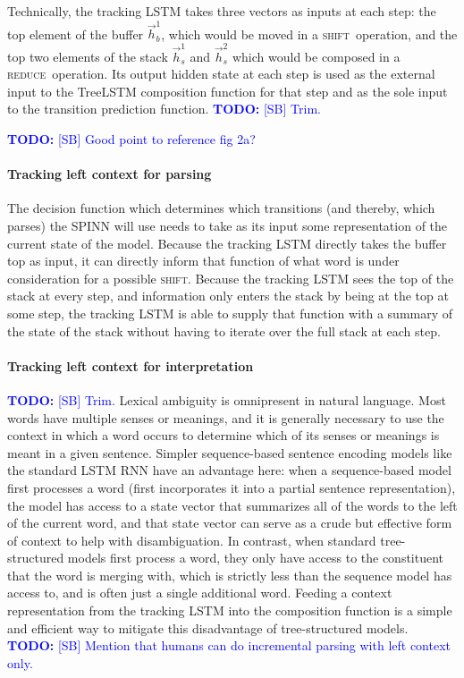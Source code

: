 \documentclass[11pt]{article}
\newcommand\todo[1]{\textcolor{blue}{\textbf{TODO:} #1}}
\newcommand{\shift}{\textsc{shift}}
\newcommand{\reduce}{\textsc{reduce}}
\begin{document}
Technically, the tracking LSTM takes three vectors as inputs at each step: the top element of the buffer $\vec{h}_b^1$, which would be moved in a \shift~operation, and the top two elements of the stack $\vec{h}_s^1$ and $\vec{h}_s^2$ which would be composed in a \reduce~operation. Its output hidden state at each step is used as the external input to the TreeLSTM composition function for that step and as the sole input to the transition prediction function. \todo{[SB] Trim.}

\todo{[SB] Good point to reference fig 2a?}

\paragraph{Tracking left context for parsing} The decision function which determines which transitions (and thereby, which parses) the SPINN will use needs to take as its input some representation of the current state of the model. Because the tracking LSTM directly takes the buffer top as input, it can directly inform that function of what word is under consideration for a possible \shift. Because the tracking LSTM sees the top of the stack at every step, and information only enters the stack by being at the top at some step, the tracking LSTM is able to supply that function with a summary of the state of the stack without having to iterate over the full stack at each step.

\paragraph{Tracking left context for interpretation} \todo{[SB] Trim.} Lexical ambiguity is omnipresent in natural language. Most words have multiple senses or meanings, and it is generally necessary to use the context in which a word occurs to determine which of its senses or meanings is meant in a given sentence. Simpler sequence-based sentence encoding models like the standard LSTM RNN have an advantage here: when a sequence-based model first processes a word (first incorporates it into a partial sentence representation), the model has access to a state vector that summarizes all of the words to the left of the current word, and that state vector can serve as a crude but effective form of context to help with disambiguation. In contrast, when standard tree-structured models first process a word, they only have access to the constituent that the word is merging with, which is strictly less than the sequence model has access to, and is often just a single additional word. Feeding a context representation from the tracking LSTM into the composition function is a simple and efficient way to mitigate this disadvantage of tree-structured models. \todo{[SB] Mention that humans can do incremental parsing with left context only.}
\end{document}
